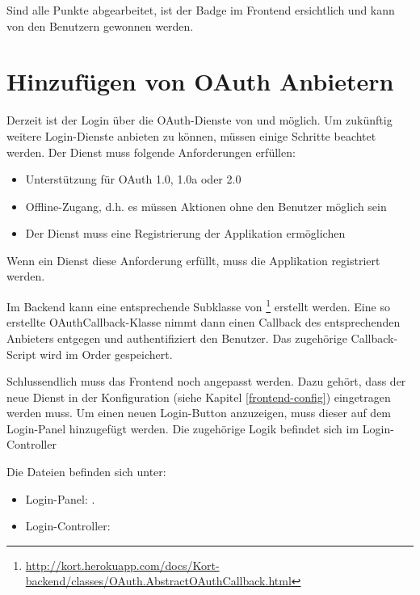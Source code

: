 Sind alle Punkte abgearbeitet, ist der Badge im Frontend ersichtlich und kann von den Benutzern gewonnen werden.

\section{Hinzufügen von OAuth Anbietern}
\label{kort-additional-oauth-provider}
Derzeit ist der Login über die \gls{OAuth}-Dienste von  und  möglich. 
Um zukünftig weitere Login-Dienste anbieten zu können, müssen einige Schritte beachtet werden.
Der Dienst muss folgende Anforderungen erfüllen:
\begin{itemize}
\item Unterstützung für OAuth 1.0, 1.0a oder 2.0
\item Offline-Zugang, d.h. es müssen Aktionen ohne den Benutzer möglich sein
\item Der Dienst muss eine Registrierung der Applikation ermöglichen
\end{itemize}

Wenn ein Dienst diese Anforderung erfüllt, muss die Applikation registriert werden.

Im Backend kann eine entsprechende Subklasse von \footnote{\url{http://kort.herokuapp.com/docs/Kort-backend/classes/OAuth.AbstractOAuthCallback.html}} erstellt werden. 
Eine so erstellte OAuthCallback-Klasse nimmt dann einen Callback des entsprechenden Anbieters entgegen und authentifiziert den Benutzer.
Das zugehörige Callback-Script wird im Order  gespeichert.

Schlussendlich muss das Frontend noch angepasst werden.
Dazu gehört, dass der neue Dienst in der Konfiguration (siehe Kapitel \ref{frontend-config}) eingetragen werden muss.
Um einen neuen Login-Button anzuzeigen, muss dieser auf dem Login-Panel hinzugefügt werden.
Die zugehörige Logik befindet sich im Login-Controller

Die Dateien befinden sich unter:
\begin{itemize}
\item Login-Panel: .
\item Login-Controller: 
\end{itemize}


